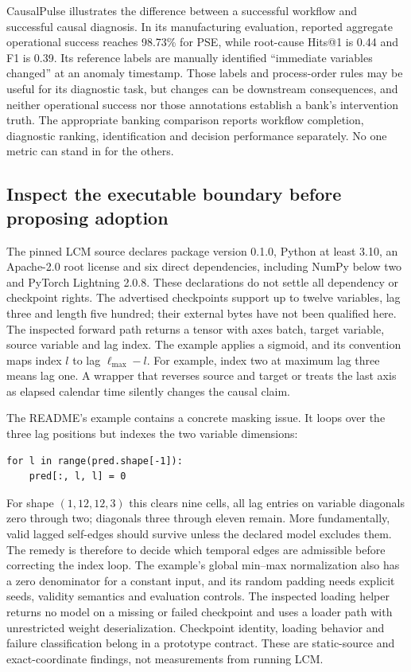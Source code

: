 CausalPulse illustrates the difference between a successful workflow and
successful causal diagnosis. In its manufacturing evaluation, reported
aggregate operational success reaches 98.73\% for PSE, while root-cause
Hits@1 is 0.44 and F1 is 0.39. Its reference labels are manually identified
``immediate variables changed'' at an anomaly timestamp. Those labels and
process-order rules may be useful for its diagnostic task, but changes can
be downstream consequences, and neither operational success nor those
annotations establish a bank's intervention truth. The appropriate banking
comparison reports workflow completion, diagnostic ranking, identification
and decision performance separately. No one metric can stand in for the
others.
\citep{exec13_pulse}

\subsection{Inspect the executable boundary before proposing adoption}

The pinned LCM source declares package version 0.1.0, Python at least 3.10,
an Apache-2.0 root license and six direct dependencies, including NumPy below
two and PyTorch Lightning 2.0.8. These declarations do not settle all
dependency or checkpoint rights. The advertised checkpoints support up to
twelve variables, lag three and length five hundred; their external bytes
have not been qualified here. The inspected forward path returns a tensor
with axes batch, target variable, source variable and lag index. The example
applies a sigmoid, and its convention maps index $l$ to lag
$\ell_{\max}-l$. For example, index two at maximum lag three means lag one.
A wrapper that reverses source and target or treats the last axis as elapsed
calendar time silently changes the causal claim.
\citep{exec15_latent_lcm}

The README's example contains a concrete masking issue. It loops over the
three lag positions but indexes the two variable dimensions:
\begin{verbatim}
for l in range(pred.shape[-1]):
    pred[:, l, l] = 0
\end{verbatim}
For shape $(1,12,12,3)$ this clears nine cells, all lag entries on variable
diagonals zero through two; diagonals three through eleven remain. More
fundamentally, valid lagged self-edges should survive unless the declared
model excludes them. The remedy is therefore to decide which temporal
edges are admissible before correcting the index loop. The example's global
min--max normalization also has a zero denominator for a constant input,
and its random padding needs explicit seeds, validity semantics and
evaluation controls. The inspected loading helper returns no model on a
missing or failed checkpoint and uses a loader path with unrestricted
weight deserialization. Checkpoint identity, loading behavior and failure
classification belong in a prototype contract. These are static-source and
exact-coordinate findings, not measurements from running LCM.
\citep{exec15_latent_lcm,exec15_latent_exact}


